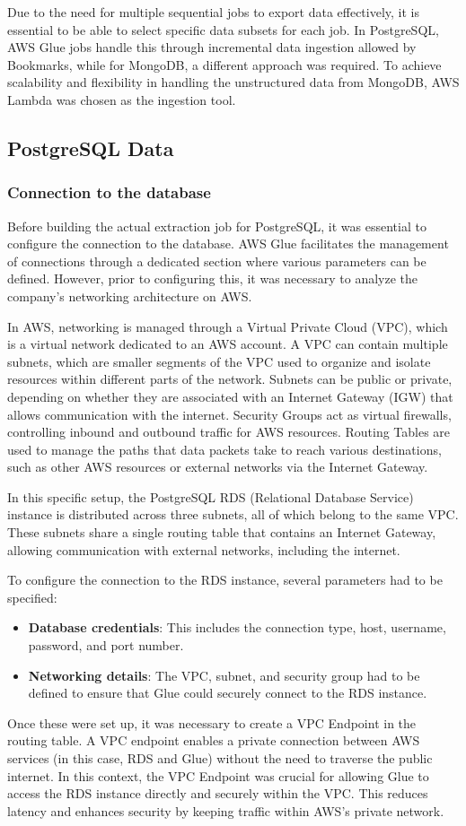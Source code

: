 Due to the need for multiple sequential jobs to export data effectively, it is essential to be able to select specific data subsets for each job. In PostgreSQL, AWS Glue jobs handle this through incremental data ingestion allowed by Bookmarks, while for MongoDB, a different approach was required. To achieve scalability and flexibility in handling the unstructured data from MongoDB, AWS Lambda was chosen as the ingestion tool.

\subsection{PostgreSQL Data}
\subsubsection{Connection to the database}
Before building the actual extraction job for PostgreSQL, it was essential to configure the connection to the database. AWS Glue facilitates the management of connections through a dedicated section where various parameters can be defined. However, prior to configuring this, it was necessary to analyze the company’s networking architecture on AWS.

In AWS, networking is managed through a Virtual Private Cloud (VPC), which is a virtual network dedicated to an AWS account. A VPC can contain multiple subnets, which are smaller segments of the VPC used to organize and isolate resources within different parts of the network. Subnets can be public or private, depending on whether they are associated with an Internet Gateway (IGW) that allows communication with the internet. Security Groups act as virtual firewalls, controlling inbound and outbound traffic for AWS resources. Routing Tables are used to manage the paths that data packets take to reach various destinations, such as other AWS resources or external networks via the Internet Gateway.

In this specific setup, the PostgreSQL RDS (Relational Database Service) instance is distributed across three subnets, all of which belong to the same VPC. These subnets share a single routing table that contains an Internet Gateway, allowing communication with external networks, including the internet.

To configure the connection to the RDS instance, several parameters had to be specified:
\begin{itemize}
    \item \textbf{Database credentials}: This includes the connection type, host, username, password, and port number.
    \item \textbf{Networking details}: The VPC, subnet, and security group had to be defined to ensure that Glue could securely connect to the RDS instance.
\end{itemize}
Once these were set up, it was necessary to create a VPC Endpoint in the routing table. A VPC endpoint enables a private connection between AWS services (in this case, RDS and Glue) without the need to traverse the public internet. In this context, the VPC Endpoint was crucial for allowing Glue to access the RDS instance directly and securely within the VPC. This reduces latency and enhances security by keeping traffic within AWS's private network.

